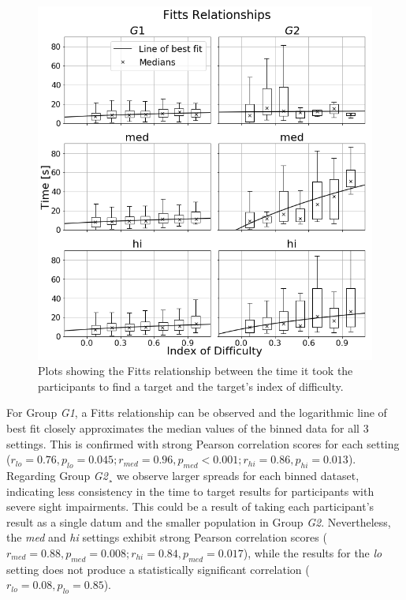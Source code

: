 \documentclass{article}
\begin{document}
\begin{figure}
  \centering
  \includegraphics[width=1.0\textwidth]{figures/fitts_fit.png}
  \caption{Plots showing the Fitts relationship between the time it took the participants to find a target and the target's index of difficulty. }\label{fig:fitts-results}
\end{figure}

For Group \textit{G1}, a Fitts relationship can be observed and the logarithmic line of best fit closely approximates the median values of the binned data for all 3 settings. 
This is confirmed with strong Pearson correlation scores for each setting ($r_{lo} = 0.76, p_{lo} = 0.045; r_{med} = 0.96, p_{med}<0.001; r_{hi} = 0.86, p_{hi} = 0.013$).
Regarding Group \textit{G2}¸ we observe larger spreads for each binned dataset, indicating less consistency in the time to target results for participants with severe sight impairments.
This could be a result of taking each participant's result as a single datum and the smaller population in Group \textit{G2}.
Nevertheless, the \textit{med} and \textit{hi} settings exhibit strong Pearson correlation scores ($r_{med} = 0.88, p_{med} = 0.008; r_{hi} = 0.84, p_{med} = 0.017$), while the results for the \textit{lo} setting does not produce a statistically significant correlation ($r_{lo} = 0.08, p_{lo} = 0.85$).
\end{document}
